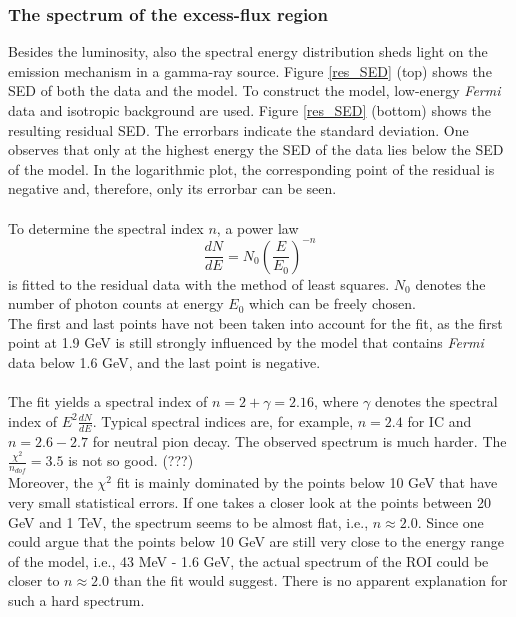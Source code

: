 \documentclass[a4paper]{article}
\begin{document}
\subsubsection{The spectrum of the excess-flux region}
Besides the luminosity, also the spectral energy distribution sheds light on the emission mechanism in a gamma-ray source. Figure \ref{res_SED} (top) shows the SED of both the data and the model. To construct the model, low-energy \textit{Fermi} data and isotropic background are used. Figure \ref{res_SED} (bottom) shows the resulting residual SED. The errorbars indicate the standard deviation. One observes that only at the highest energy the SED of the data lies below the SED of the model. In the logarithmic plot, the corresponding point of the residual is negative and, therefore, only its errorbar can be seen.\\
\\
To determine the spectral index $n$, a power law 
\begin{equation}
\frac{dN}{dE} = N_0 \left( \frac{E}{E_0}\right)^{-n}
\end{equation}
is fitted to the residual data with the method of least squares. $N_0$ denotes the number of photon counts at energy $E_0$ which can be freely chosen.\\
The first and last points have not been taken into account for the fit, as the first point at 1.9 GeV is still strongly influenced by the model that contains \textit{Fermi} data below 1.6 GeV, and the last point is negative.\\
\\
The fit yields a spectral index of {\boldmath$n = 2 + \gamma = 2.16$}, where $\gamma$ denotes the spectral index of $E^2 \frac{dN}{dE}$. Typical spectral indices are, for example, {\boldmath$n = 2.4$} for IC and {\boldmath$n = 2.6 - 2.7$} for neutral pion decay. The observed spectrum is much harder. The {\boldmath$\frac{\chi^2}{n_{dof}} = 3.5$} is not so good. (???)\\
Moreover, the $\chi^2$ fit is mainly dominated by the points below 10 GeV that have very small statistical errors. If one takes a closer look at the points between 20 GeV and 1 TeV, the spectrum seems to be almost flat, i.e., $n \approx 2.0$. Since one could argue that the points below 10 GeV are still very close to the energy range of the model, i.e., 43 MeV - 1.6 GeV, the actual spectrum of the ROI could be closer to $n \approx 2.0$ than the fit would suggest. There is no apparent explanation for such a hard spectrum.\\
\end{document}
